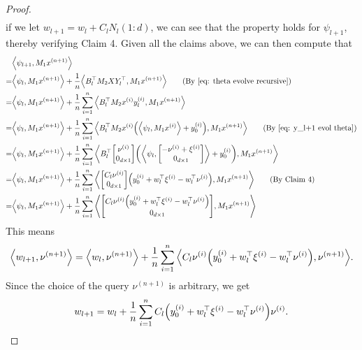 \documentclass{article}
\newcommand{\explain}[1]{\tag*{(#1)}}
\newcommand{\indot}[2]{{\left<#1, #2\right>}}
\begin{document}
\begin{proof}
\begin{align}
    \end{align}
    if we let $w_{l+1} = w_l + C_l N_l(1:d)$, we can see that the property holds for $\psi_{l+1}$,
    thereby verifying Claim 4.
    Given all the claims above,
    we can then compute that
    \begin{align}
        &\indot{\psi_{l+1}}{M_1 x^{(n+1)}}\\
        =&\indot{\psi_l}{M_1 x^{(n+1)}} + \frac{1}{n}\indot{B_l^\top M_2 X Y_l^\top}{M_1 x^{(n+1)}} \explain{By~\eqref{eq: theta evolve recursive}}\\
        =&\indot{\psi_l}{M_1 x^{(n+1)}} + \frac{1}{n}\sum_{i=1}^n \indot{B_l^\top M_2 x^{(i)} y_l^{(i)}}{M_1 x^{(n+1)}}\\
        =&\indot{\psi_l}{M_1 x^{(n+1)}} +
        \frac{1}{n} \sum_{i=1}^n \indot{B_l^\top M_2 x^{(i)} \qty(\indot{\psi_l}{M_1 x^{(i)}} + y_0^{(i)})}{M_1 x^{(n+1)}} \explain{By \eqref{eq: y_l+1 evol theta}}\\
        =&\indot{\psi_l}{M_1 x^{(n+1)}} +
        \frac{1}{n} \sum_{i=1}^n
        \indot{B_l^\top \mqty[\nu^{(i)}\\0_{d\times 1}]
        \qty( \indot{\psi_l}{\mqty[-\nu^{(i)} + \xi^{(i)}\\ 0_{d\times 1}]} + y_0^{(i)})}{M_1 x^{(n+1)}}\\
        =&\indot{\psi_l}{M_1 x^{(n+1)}} +
        \frac{1}{n} \sum_{i=1}^n
        \indot{\mqty[C_l \nu^{(i)}\\0_{d\times 1}]
        \qty( y_0^{(i)} +  w_l^\top \xi^{(i)} - w_l^\top \nu^{(i)} )}{M_1 x^{(n+1)}} \explain{By Claim 4}\\
        =&\indot{\psi_l}{M_1 x^{(n+1)}} +
        \frac{1}{n} \sum_{i=1}^n
        \indot{\mqty[C_l \nu^{(i)} \qty(y_0^{(i)} + w_l^\top \xi^{(i)} - w_l^\top \nu^{(i)})\\0_{d\times 1}]}
        {M_1 x^{(n+1)}}\\
    \end{align}
    This means
    \begin{align}
        \indot{w_{l+1}}{\nu^{(n+1)}}
        = \indot{w_l}{\nu^{(n+1)}}
        + \frac{1}{n} \sum_{i=1}^n
        \indot{C_l \nu^{(i)} \qty(y_0^{(i)} + w_l^\top \xi^{(i)} - w_l^\top \nu^{(i)})}{
        \nu^{(n+1)}}.
    \end{align}
    Since the choice of the query $\nu^{(n+1)}$ is arbitrary, we get
    \begin{align}
        w_{l+1} = w_l + \frac{1}{n}\sum_{i=1}^n C_l \qty(y_0^{(i)} + w_l^\top \xi^{(i)} - w_l^\top \nu^{(i)}) \nu^{(i)}.

\end{align}
\end{proof}
\end{document}
